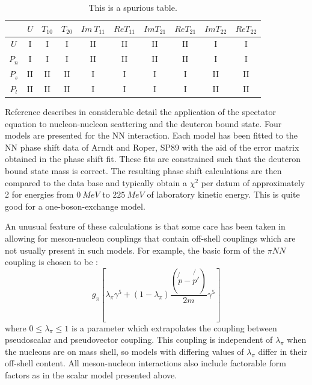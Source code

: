 \documentclass[mythesis.tex]{subfiles}
\begin{document}
\begin{table}
\caption{This is a spurious table.}
\label{classes}
\begin{center}
\begin{tabular}{cccccccccc}\hline\hline

  & {$U$}  & {$T_{10}$}  & {$T_{20}$}  &
{$Im~T_{11}$}  & {$ReT_{11}$}  & {$ImT_{21}$}  &{$ReT_{21}$}  & {$ImT_{22}$}
  & {$ReT_{22}$}  \\
\hline
{$U$}    & I  & I   & I   & II  & II  & II  & II  & I   & I  \\
{$P_n$}  & I  & I   & I   & II  & II  & II  & II  & I   & I  \\
{$P_s$}  & II & II  & II  & I   & I   & I   & I   & II  & II  \\
{$P_l$}  & II & II  & II  & I   & I   & I   & I   & II  & II \\ \hline\hline
\end{tabular}
\end{center}
\end{table}

Reference \cite{FVOHB} describes in considerable detail the application
of the
spectator equation to nucleon-nucleon scattering and the deuteron bound
state. Four models are presented for the NN interaction. Each model has
been fitted to the NN phase shift data of Arndt and Roper, SP89
\cite{ArndtandRoper}  with the aid of the error
matrix obtained in the phase shift fit. These fits are constrained such
that the deuteron bound state mass is correct. The resulting phase shift
calculations are then compared to the data base and typically obtain a
$\chi^2$ per datum of approximately 2 for energies from $0~MeV$ to $225~MeV$
of laboratory kinetic energy. This is quite good for a one-boson-exchange
model.

An unusual feature of these calculations is that some care has been taken
in allowing for meson-nucleon couplings that contain off-shell couplings
which are not usually present in such models. For example, the basic form
of the $\pi NN$ coupling is chosen to be \cite{FVOHA,FVOHB,BuckandG}:
%
\begin{equation}
g_\pi \left[ \lambda_\pi \gamma^5+(1-\lambda_\pi)\frac{(\not{p}-\not{p'})}
{2m}\gamma^5\right]
\end{equation}
%
where $0\leq \lambda_\pi\leq 1$ is a parameter which extrapolates the
coupling between pseudoscalar and pseudovector coupling. This coupling is
independent of $\lambda_\pi$ when the nucleons are on mass shell, so
models with differing values of $\lambda_\pi$ differ in their off-shell
content. All meson-nucleon interactions also include factorable form factors
as in the scalar model presented above.
\end{document}
